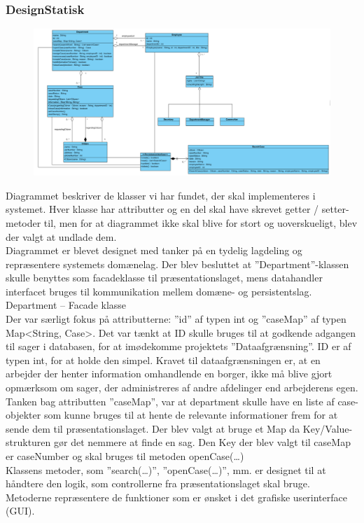 \subsubsection{DesignStatisk}
\begin{figure}[h]
\includegraphics[width = \linewidth]{./PNG/designklassediagram.PNG}
\end{figure}
Diagrammet beskriver de klasser vi har fundet, der skal implementeres i systemet. Hver klasse har attributter og en del skal have skrevet getter / setter-metoder til, men for at diagrammet ikke skal blive for stort og uoverskueligt, blev der valgt at undlade dem.\\
Diagrammet er blevet designet med tanker på en tydelig lagdeling og repræsentere systemets domænelag. Der blev besluttet at ”Department”-klassen skulle benyttes som facadeklasse til præsentationslaget, mens datahandler interfacet bruges til kommunikation mellem domæne- og persistentslag.
Department – Facade klasse\\
Der var særligt fokus på attributterne: ”id” af typen int og ”caseMap” af typen Map<String, Case>. Det var tænkt at ID skulle bruges til at godkende adgangen til sager i databasen, for at imødekomme projektets ”Dataafgrænsning”. ID er af typen int, for at holde den simpel. Kravet til dataafgrænsningen er, at en arbejder der henter information omhandlende en borger, ikke må blive gjort opmærksom om sager, der administreres af andre afdelinger end arbejderens egen.\\
Tanken bag attributten ”caseMap”, var at department skulle have en liste af case-objekter som kunne bruges til at hente de relevante informationer frem for at sende dem til præsentationslaget. Der blev valgt at bruge et Map da Key/Value-strukturen gør det nemmere at finde en sag. Den Key der blev valgt til caseMap er caseNumber og skal bruges til metoden openCase(…)\\
Klassens metoder, som ”search(…)”, ”openCase(…)”, mm. er designet til at håndtere den logik, som controllerne fra præsentationslaget skal bruge. Metoderne repræsentere de funktioner som er ønsket i det grafiske userinterface (GUI).\\
